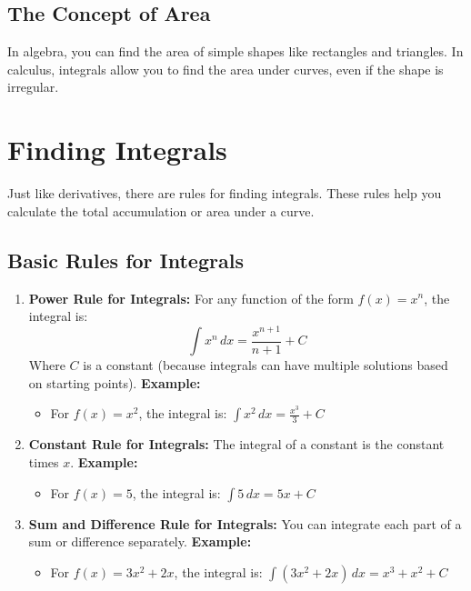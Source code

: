 \subsection{The Concept of Area}
In algebra, you can find the area of simple shapes like rectangles and triangles. In calculus, integrals allow you to find the area under curves, even if the shape is irregular.

\section{Finding Integrals}
Just like derivatives, there are rules for finding integrals. These rules help you calculate the total accumulation or area under a curve.

\subsection{Basic Rules for Integrals}
\begin{enumerate}
    \item \textbf{Power Rule for Integrals:} For any function of the form \( f(x) = x^n \), the integral is:
    \[
    \int x^n \, dx = \frac{x^{n+1}}{n+1} + C
    \]
    Where \( C \) is a constant (because integrals can have multiple solutions based on starting points).
    \textbf{Example:}
    \begin{itemize}
        \item For \( f(x) = x^2 \), the integral is: \( \int x^2 \, dx = \frac{x^3}{3} + C \)
    \end{itemize}
    \item \textbf{Constant Rule for Integrals:} The integral of a constant is the constant times \( x \).
    \textbf{Example:}
    \begin{itemize}
        \item For \( f(x) = 5 \), the integral is: \( \int 5 \, dx = 5x + C \)
    \end{itemize}
    \item \textbf{Sum and Difference Rule for Integrals:} You can integrate each part of a sum or difference separately.
    \textbf{Example:}
    \begin{itemize}
        \item For \( f(x) = 3x^2 + 2x \), the integral is: \( \int (3x^2 + 2x) \, dx = x^3 + x^2 + C \)
    \end{itemize}
\end{enumerate}

